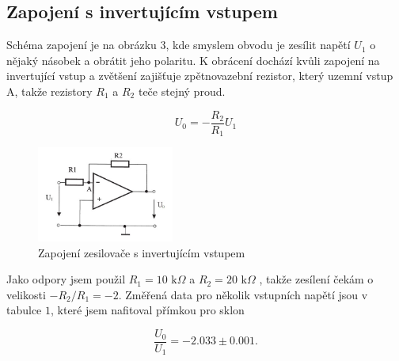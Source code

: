 \documentclass[a4paper,11pt]{article}
\begin{document}

\par\noindent

\subsection{Zapojení s invertujícím vstupem}

Schéma zapojení je na obrázku 3, kde smyslem obvodu je zesílit napětí $ U_1 $ o nějaký násobek a obrátit jeho polaritu. K obrácení dochází kvůli zapojení na invertující vstup a zvětšení zajišťuje zpětnovazební rezistor, který uzemní vstup A, takže rezistory $ R_1 $ a $ R_2 $ teče stejný proud.

\begin{equation}
U_{0} = - \frac{R_2}{R_1} U_1
\end{equation}

\begin{figure}[htpb]
    \centering
    \includegraphics[width=0.4\textwidth]{invertujici_sch.jpg}
    \caption{Zapojení zesilovače s invertujícím vstupem}
\end{figure}

Jako odpory jsem použil $ R_1 = 10 \text{ k} \Omega $ a $ R_2 = 20 \text{ k} \Omega  $ , takže zesílení čekám o velikosti $ - R_2 / R_1 = -2 $. Změřená data pro několik vstupních napětí jsou v tabulce $ 1 $, které jsem nafitoval přímkou pro sklon 

\begin{equation}
\frac{U_0}{U_1} = -2.033 \pm 0.001.
\end{equation}
\end{document}
